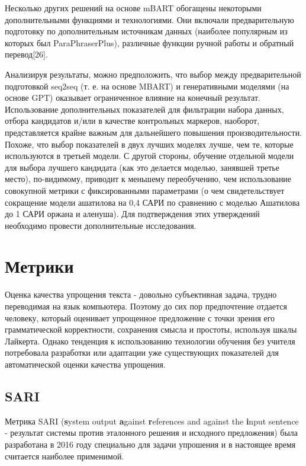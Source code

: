 Несколько других решений на основе mBART обогащены некоторыми дополнительными функциями и технологиями. Они включали предварительную подготовку по дополнительным источникам данных (наиболее популярным из которых был ParaPhraserPlus), различные функции ручной работы и обратный перевод[26].

Анализируя результаты, можно предположить, что выбор между предварительной подготовкой seq2seq (т. е. на основе MBART) и генеративными моделями (на основе GPT) оказывает ограниченное влияние на конечный результат. Использование дополнительных показателей для фильтрации набора данных, отбора кандидатов и/или в качестве контрольных маркеров, наоборот, представляется крайне важным для дальнейшего повышения производительности. Похоже, что выбор показателей в двух лучших моделях лучше, чем те, которые используются в третьей модели. С другой стороны, обучение отдельной модели для выбора лучшего кандидата (как это делается моделью, занявшей третье место), по-видимому, приводит к меньшему переобучению, чем использование совокупной метрики с фиксированными параметрами (о чем свидетельствует сокращение модели ашатилова на 0,4 САРИ по сравнению с моделью Ашатилова до 1 САРИ оржана и аленуша). Для подтверждения этих утверждений необходимо провести дополнительные исследования.

\section{Метрики}

Оценка качества упрощения текста - довольно субъективная задача, трудно переводимая на язык компьютера. Поэтому до сих пор предпочтение отдается человеку, который оценивает упрощенное предложение с точки зрения его грамматической корректности, сохранения смысла и простоты, используя шкалы Лайкерта\footnotemark{}. Однако тенденция к использованию технологии обучения без учителя потребовала разработки или адаптации уже существующих показателей для автоматической оценки качества упрощения.

\subsection{SARI}

Метрика SARI (\textbf{s}ystem output \textbf{a}gainst \textbf{r}eferences and against the \textbf{i}nput sentence - результат системы против эталонного решения и исходного предложения) была разработана в 2016 году специально для задачи упрошения и в настоящее время считается наиболее применимой\cite{xu_optimizing_2016}.

